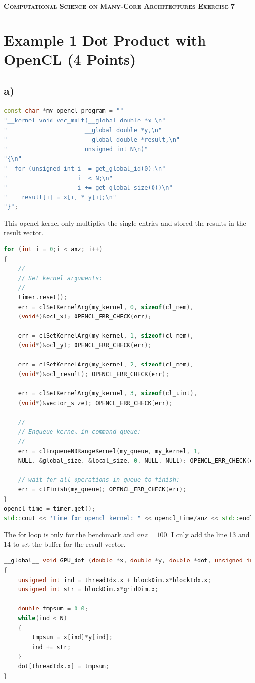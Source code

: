 \documentclass[11pt,a4paper]{article}
\begin{document}
\begin{center}
	\fontsize{24pt}{10pt}\selectfont
	\textsc{\textbf{Computational Science on Many-Core Architectures  Exercise 7}}
\end{center}
\section*{Example 1 Dot Product with OpenCL (4 Points)}
\subsection*{a)}
\begin{lstlisting}[language=C++, caption={opencl kernel}]
const char *my_opencl_program = ""
"__kernel void vec_mult(__global double *x,\n"
"                      __global double *y,\n"
"                      __global double *result,\n"
"                      unsigned int N\n)"
"{\n"
"  for (unsigned int i  = get_global_id(0);\n"
"                    i  < N;\n"
"                    i += get_global_size(0))\n"
"    result[i] = x[i] * y[i];\n"
"}"; 
\end{lstlisting}
\noindent
This opencl kernel only multiplies the single entries and stored the results in the result vector.
\begin{lstlisting}[language=C++, caption={Benchmark for the opencl}]
for (int i = 0;i < anz; i++)
{
	//
	// Set kernel arguments:
	//
	timer.reset();
	err = clSetKernelArg(my_kernel, 0, sizeof(cl_mem),  
	(void*)&ocl_x); OPENCL_ERR_CHECK(err);
	
	err = clSetKernelArg(my_kernel, 1, sizeof(cl_mem),  
	(void*)&ocl_y); OPENCL_ERR_CHECK(err);
	
	err = clSetKernelArg(my_kernel, 2, sizeof(cl_mem),  
	(void*)&ocl_result); OPENCL_ERR_CHECK(err);
	
	err = clSetKernelArg(my_kernel, 3, sizeof(cl_uint), 
	(void*)&vector_size); OPENCL_ERR_CHECK(err);
	
	//
	// Enqueue kernel in command queue:
	//
	err = clEnqueueNDRangeKernel(my_queue, my_kernel, 1, 
	NULL, &global_size, &local_size, 0, NULL, NULL); OPENCL_ERR_CHECK(err);
	
	// wait for all operations in queue to finish:
	err = clFinish(my_queue); OPENCL_ERR_CHECK(err);
}
opencl_time = timer.get();
std::cout << "Time for opencl kernel: " << opencl_time/anz << std::endl;
\end{lstlisting}
The for loop is only for the benchmark and $anz = 100$.
I only add the line 13 and 14 to set the buffer for the result vector.
\begin{lstlisting}[language=C++, caption={CUDA kernel}]
__global__ void GPU_dot (double *x, double *y, double *dot, unsigned int N)
{
	unsigned int ind = threadIdx.x + blockDim.x*blockIdx.x;
	unsigned int str = blockDim.x*gridDim.x;
	
	double tmpsum = 0.0;
	while(ind < N)
	{
		tmpsum = x[ind]*y[ind];
		ind += str;
	}
	dot[threadIdx.x] = tmpsum;
}
\end{lstlisting}
\end{document}
